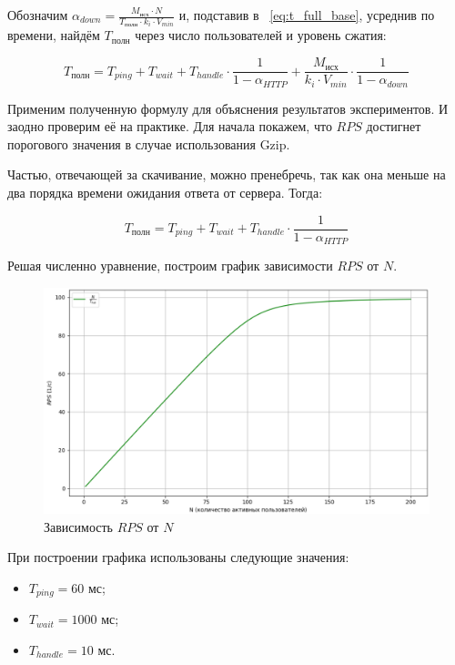 \documentclass[12pt]{article}
\begin{document}
Обозначим $\alpha_{down} = \frac{M_{\text{исх}} \cdot N}{T_{\text{полн}} \cdot k_{i} \cdot V_{min}}$ и, подставив в ~\eqref{eq:t_full_base},
усреднив по времени, найдём $T_{\text{полн}}$ через число пользователей и уровень сжатия:

\begin{equation}
    T_{\text{полн}} = T_{ping} + T_{wait} + T_{handle} \cdot \frac{1}{1 - \alpha_{HTTP}} + \frac{M_{\text{исх}}}{k_{i} \cdot V_{min}} \cdot \frac{1}{1 - \alpha_{down}}
    \label{eq:t_full_estimate}
\end{equation}

Применим полученную формулу для объяснения результатов экспериментов. И заодно проверим её на практике.
Для начала покажем, что $RPS$ достигнет порогового значения в случае использования Gzip.

Частью, отвечающей за скачивание, можно пренебречь, так как она меньше на два порядка времени ожидания ответа от сервера. Тогда:

\[
    T_{\text{полн}} = T_{ping} + T_{wait} + T_{handle} \cdot \frac{1}{1 - \alpha_{HTTP}}
\]

Решая численно уравнение, построим график зависимости $RPS$ от $N$.

\begin{figure}[H]
    \centering
    \includegraphics[width=1\textwidth]{../images/rps-from-n.png}
    \caption{Зависимость $RPS$ от $N$}
\end{figure}

При построении графика использованы следующие значения:

\begin{itemize}
    \item $T_{ping} = 60 \text{ мс}$;
    \item $T_{wait} = 1000 \text{ мс}$;
    \item $T_{handle} = 10 \text{ мс}$.
\end{itemize}
\end{document}
